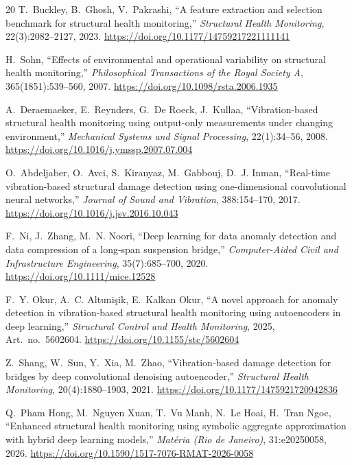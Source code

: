 \documentclass[11pt,a4paper]{article}
\begin{document}
\begin{thebibliography}{20}
T.~Buckley, B.~Ghosh, V.~Pakrashi,
``A feature extraction and selection benchmark for structural health
monitoring,''
\emph{Structural Health Monitoring}, 22(3):2082--2127, 2023.
\url{https://doi.org/10.1177/14759217221111141}

H.~Sohn,
``Effects of environmental and operational variability on structural health
monitoring,''
\emph{Philosophical Transactions of the Royal Society A},
365(1851):539--560, 2007.
\url{https://doi.org/10.1098/rsta.2006.1935}

A.~Deraemaeker, E.~Reynders, G.~De Roeck, J.~Kullaa,
``Vibration-based structural health monitoring using output-only measurements
under changing environment,''
\emph{Mechanical Systems and Signal Processing}, 22(1):34--56, 2008.
\url{https://doi.org/10.1016/j.ymssp.2007.07.004}

O.~Abdeljaber, O.~Avci, S.~Kiranyaz, M.~Gabbouj, D.~J. Inman,
``Real-time vibration-based structural damage detection using one-dimensional
convolutional neural networks,''
\emph{Journal of Sound and Vibration}, 388:154--170, 2017.
\url{https://doi.org/10.1016/j.jsv.2016.10.043}

F.~Ni, J.~Zhang, M.~N. Noori,
``Deep learning for data anomaly detection and data compression of a
long-span suspension bridge,''
\emph{Computer-Aided Civil and Infrastructure Engineering},
35(7):685--700, 2020.
\url{https://doi.org/10.1111/mice.12528}

F.~Y. Okur, A.~C. Altuni\c{s}ik, E.~Kalkan Okur,
``A novel approach for anomaly detection in vibration-based structural health
monitoring using autoencoders in deep learning,''
\emph{Structural Control and Health Monitoring}, 2025, Art.\ no.\ 5602604.
\url{https://doi.org/10.1155/stc/5602604}

Z.~Shang, W.~Sun, Y.~Xia, M.~Zhao,
``Vibration-based damage detection for bridges by deep convolutional denoising
autoencoder,''
\emph{Structural Health Monitoring}, 20(4):1880--1903, 2021.
\url{https://doi.org/10.1177/1475921720942836}

\color{red}
Q.~Pham Hong, M.~Nguyen Xuan, T.~Vu Manh, N.~Le Hoai, H.~Tran Ngoc,
``Enhanced structural health monitoring using symbolic aggregate
approximation with hybrid deep learning models,''
\emph{Mat\'eria (Rio de Janeiro)}, 31:e20250058, 2026.
\url{https://doi.org/10.1590/1517-7076-RMAT-2026-0058}
\color{black}


\end{thebibliography}
\end{document}
